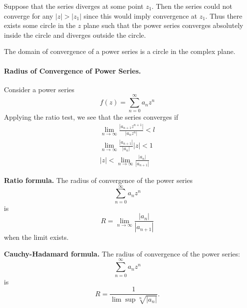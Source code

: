 Suppose that the series diverges at some point $z_1$.  Then the series could
not converge for any $|z| > |z_1|$ since this would imply convergence at
$z_1$.  Thus there exists some circle in the $z$ plane such that the power
series converges absolutely inside the circle and diverges outside the circle.

\begin{Result}
  The domain of convergence of a power series is a circle in the 
  complex plane.
\end{Result}









\paragraph{Radius of Convergence of Power Series.}
Consider a power series
\[
f(z) = \sum_{n = 0}^\infty a_n z^n
\]
Applying the ratio test, we see that the series converges if
\begin{gather*}
  \lim_{n \to \infty} \frac{\left| a_{n+1} z^{n+1} \right|}{\left| a_n z^n \right|} < l 
  \\
  \lim_{n \to \infty} \frac{|a_{n+1}|}{|a_n|} |z| < 1 
  \\
  |z| < \lim_{n \to \infty} \frac{|a_n|}{|a_{n+1}|}
\end{gather*}





\begin{Result}
  \label{result ratio formula}
  \textbf{Ratio formula.}  
  The radius of convergence of the power series 
  \[
  \sum_{n = 0}^\infty a_n z^n
  \]
  is
  \[
  R = \lim_{n \to \infty} \frac{|a_n|}{|a_{n+1}|}
  \]
  when the limit exists.
\end{Result}






\begin{Result}
  \label{result cauchy hadamard formula}
  \textbf{Cauchy-Hadamard formula.}  
  The radius of convergence of the power series:
  \[
  \sum_{n = 0}^\infty a_n z^n
  \]
  is
  \[
  R = \frac{ 1 }{ \lim \sup \sqrt[n]{ |a_n| } }.
  \]
\end{Result}




